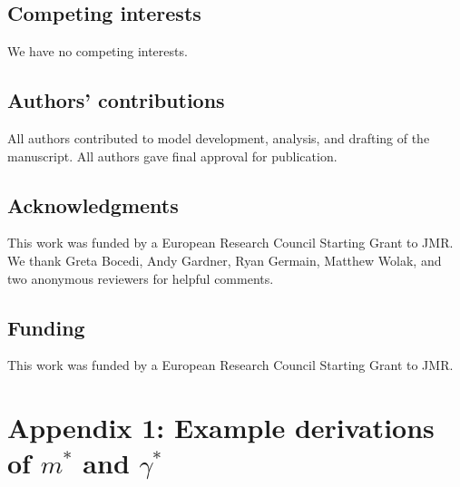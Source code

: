 \documentclass[12pt]{article}
\begin{document}
\subsection*{Competing interests}

We have no competing interests.

\subsection*{Authors' contributions}

All authors contributed to model development, analysis, and drafting of the manuscript. All authors gave final approval for publication. 

\subsection*{Acknowledgments}

This work was funded by a European Research Council Starting Grant to JMR. We thank Greta Bocedi, Andy Gardner, Ryan Germain, Matthew Wolak, and two anonymous reviewers for helpful comments.

\subsection*{Funding}

This work was funded by a European Research Council Starting Grant to JMR.

\section*{Appendix 1: Example derivations of $m^{*}$ and $\gamma^{*}$}
\end{document}
